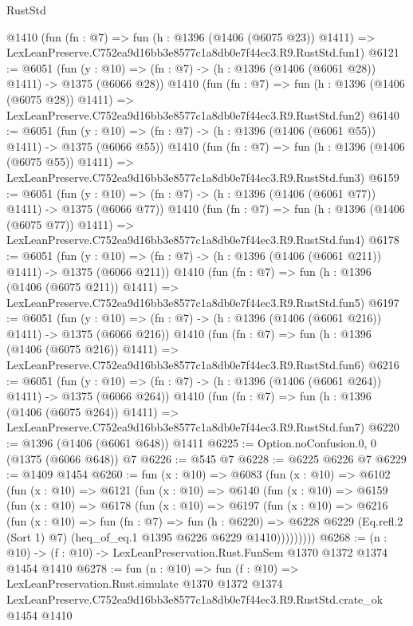 \begin{lexlean}{RustStd}
\begin{coremodule}
    @1410
    (fun (fn : @7) =>
    fun (h : @1396 (@1406 (@6075 @23)) @1411) =>
    LexLeanPreserve.C752ea9d16bb3e8577c1a8db0e7f44ec3.R9.RustStd.fun1)
@6121 := @6051
    (fun (y : @10) => (fn : @7) -> (h : @1396 (@1406 (@6061 @28)) @1411) -> @1375 (@6066 @28))
    @1410
    (fun (fn : @7) =>
    fun (h : @1396 (@1406 (@6075 @28)) @1411) =>
    LexLeanPreserve.C752ea9d16bb3e8577c1a8db0e7f44ec3.R9.RustStd.fun2)
@6140 := @6051
    (fun (y : @10) => (fn : @7) -> (h : @1396 (@1406 (@6061 @55)) @1411) -> @1375 (@6066 @55))
    @1410
    (fun (fn : @7) =>
    fun (h : @1396 (@1406 (@6075 @55)) @1411) =>
    LexLeanPreserve.C752ea9d16bb3e8577c1a8db0e7f44ec3.R9.RustStd.fun3)
@6159 := @6051
    (fun (y : @10) => (fn : @7) -> (h : @1396 (@1406 (@6061 @77)) @1411) -> @1375 (@6066 @77))
    @1410
    (fun (fn : @7) =>
    fun (h : @1396 (@1406 (@6075 @77)) @1411) =>
    LexLeanPreserve.C752ea9d16bb3e8577c1a8db0e7f44ec3.R9.RustStd.fun4)
@6178 := @6051
    (fun (y : @10) => (fn : @7) -> (h : @1396 (@1406 (@6061 @211)) @1411) -> @1375 (@6066 @211))
    @1410
    (fun (fn : @7) =>
    fun (h : @1396 (@1406 (@6075 @211)) @1411) =>
    LexLeanPreserve.C752ea9d16bb3e8577c1a8db0e7f44ec3.R9.RustStd.fun5)
@6197 := @6051
    (fun (y : @10) => (fn : @7) -> (h : @1396 (@1406 (@6061 @216)) @1411) -> @1375 (@6066 @216))
    @1410
    (fun (fn : @7) =>
    fun (h : @1396 (@1406 (@6075 @216)) @1411) =>
    LexLeanPreserve.C752ea9d16bb3e8577c1a8db0e7f44ec3.R9.RustStd.fun6)
@6216 := @6051
    (fun (y : @10) => (fn : @7) -> (h : @1396 (@1406 (@6061 @264)) @1411) -> @1375 (@6066 @264))
    @1410
    (fun (fn : @7) =>
    fun (h : @1396 (@1406 (@6075 @264)) @1411) =>
    LexLeanPreserve.C752ea9d16bb3e8577c1a8db0e7f44ec3.R9.RustStd.fun7)
@6220 := @1396 (@1406 (@6061 @648)) @1411
@6225 := Option.noConfusion.{0, 0} (@1375 (@6066 @648)) @7
@6226 := @545 @7
@6228 := @6225 @6226 @7
@6229 := @1409 @1454
@6260 := fun (x : @10) =>
  @6083
    (fun (x : @10) =>
    @6102
      (fun (x : @10) =>
      @6121
        (fun (x : @10) =>
        @6140
          (fun (x : @10) =>
          @6159
            (fun (x : @10) =>
            @6178
              (fun (x : @10) =>
              @6197
                (fun (x : @10) =>
                @6216
                  (fun (x : @10) =>
                  fun (fn : @7) =>
                  fun (h : @6220) =>
                  @6228
                    @6229
                    (Eq.refl.{2} (Sort 1) @7)
                    (heq_of_eq.{1} @1395 @6226 @6229 @1410)))))))))
@6268 := (n : @10) -> (f : @10) -> LexLeanPreservation.Rust.FunSem @1370 @1372 @1374 @1454 @1410
@6278 := fun (n : @10) =>
  fun (f : @10) =>
  LexLeanPreservation.Rust.simulate
    @1370
    @1372
    @1374
    LexLeanPreserve.C752ea9d16bb3e8577c1a8db0e7f44ec3.R9.RustStd.crate_ok
    @1454
    @1410
\end{coremodule}
\end{lexlean}
